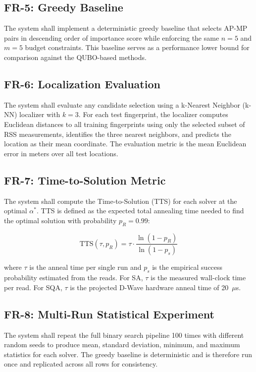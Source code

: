 \documentclass[12pt,a4paper]{article}
\begin{document}
\subsection{FR-5: Greedy Baseline}

The system shall implement a deterministic greedy baseline that selects
AP-MP pairs in descending order of importance score while enforcing the same
$n = 5$ and $m = 5$ budget constraints. This baseline serves as a
performance lower bound for comparison against the QUBO-based methods.

\subsection{FR-6: Localization Evaluation}

The system shall evaluate any candidate selection using a k-Nearest Neighbor
(k-NN) localizer with $k = 3$. For each test fingerprint, the localizer
computes Euclidean distances to all training fingerprints using only the
selected subset of RSS measurements, identifies the three nearest neighbors,
and predicts the location as their mean coordinate. The evaluation metric is
the mean Euclidean error in meters over all test locations.

\subsection{FR-7: Time-to-Solution Metric}

The system shall compute the Time-to-Solution (TTS) for each solver at the
optimal $\alpha^{*}$. TTS is defined as the expected total annealing time
needed to find the optimal solution with probability $p_R = 0.99$:

\begin{equation}
    \text{TTS}(\tau, p_R) = \tau \cdot \frac{\ln(1 - p_R)}{\ln(1 - p_s)}
\end{equation}

where $\tau$ is the anneal time per single run and $p_s$ is the empirical
success probability estimated from the reads. For SA, $\tau$ is the measured
wall-clock time per read. For SQA, $\tau$ is the projected D-Wave hardware
anneal time of 20~$\mu$s.

\subsection{FR-8: Multi-Run Statistical Experiment}

The system shall repeat the full binary search pipeline 100 times with
different random seeds to produce mean, standard deviation, minimum, and
maximum statistics for each solver. The greedy baseline is deterministic and
is therefore run once and replicated across all rows for consistency.
\end{document}
